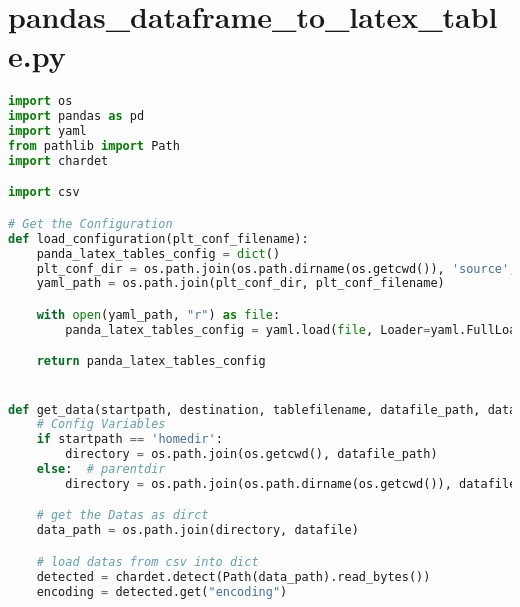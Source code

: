 
\section{pandas_dataframe_to_latex_table.py}
\begin{lstlisting}[language=python, caption=pandas_dataframe_to_latex_table.py CSV - LaTex Tabelle,captionpos=b,label={lst:Python LaTex - pandas_dataframe_to_latex_table},breaklines=true]
import os
import pandas as pd
import yaml
from pathlib import Path
import chardet

import csv

# Get the Configuration
def load_configuration(plt_conf_filename):
    panda_latex_tables_config = dict()
    plt_conf_dir = os.path.join(os.path.dirname(os.getcwd()), 'source', 'configuration')
    yaml_path = os.path.join(plt_conf_dir, plt_conf_filename)

    with open(yaml_path, "r") as file:
        panda_latex_tables_config = yaml.load(file, Loader=yaml.FullLoader)

    return panda_latex_tables_config


def get_data(startpath, destination, tablefilename, datafile_path, datafile, alternative_cvs_load, separator, decimal):
    # Config Variables
    if startpath == 'homedir':
        directory = os.path.join(os.getcwd(), datafile_path)
    else:  # parentdir
        directory = os.path.join(os.path.dirname(os.getcwd()), datafile_path)

    # get the Datas as dirct
    data_path = os.path.join(directory, datafile)

    # load datas from csv into dict
    detected = chardet.detect(Path(data_path).read_bytes())
    encoding = detected.get("encoding")


\end{lstlisting}
